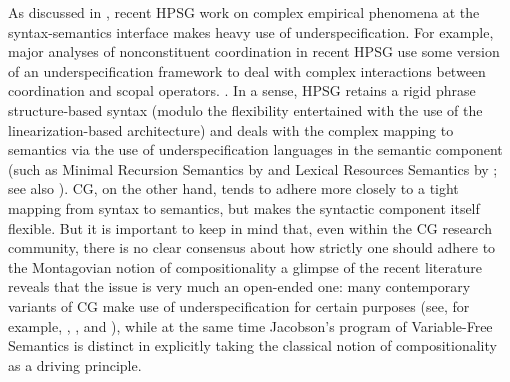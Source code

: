 \documentclass[output=paper,biblatex,babelshorthands,newtxmath,draftmode,colorlinks,citecolor=brown]{langscibook}
\begin{document}
As discussed in , recent HPSG work on
complex empirical phenomena at the syntax-semantics interface makes
heavy use of underspecification. For example, major analyses of
nonconstituent coordination in recent HPSG use some version of an
underspecification framework to deal with complex interactions between
coordination and scopal operators.
\citep{Yatabe2001a,BS2004a,parkea18gapping,parkDiss,yatabe-tam2017}.
In a sense, HPSG retains a rigid phrase structure-based syntax (modulo
the flexibility entertained with the use of the linearization-based
architecture) and deals with the complex mapping to semantics via the
use of underspecification languages in the semantic component (such as
Minimal Recursion Semantics by \citealt{CFPS2005a} and Lexical Resources
Semantics by \citealt{RS2004a-u}; see also ). CG, on the other hand, tends to adhere
more closely to a tight mapping from syntax to semantics, but makes
the syntactic component itself flexible. But it is important to keep
in mind that, even within the CG research community,
there is no clear consensus about 
how strictly one should adhere to the
Montagovian notion of compositionality \emdashUS a glimpse of the recent 
literature reveals that the issue is very much an open-ended one: 
many contemporary variants of CG 
make use of underspecification for certain purposes (see, for example, 
\citealt[Chapter~7]{steedman2012}, \citealt{bekki14},
\citealt{bekkimineshima17} and \citealt{kubotaEA2019Geach}), 
while at the same time Jacobson's 
\citeyearpar{Jacobson1999a,Jacobson2000a} program of Variable-Free
Semantics is distinct in explicitly taking the classical notion of compositionality
as a driving principle.



\end{document}
